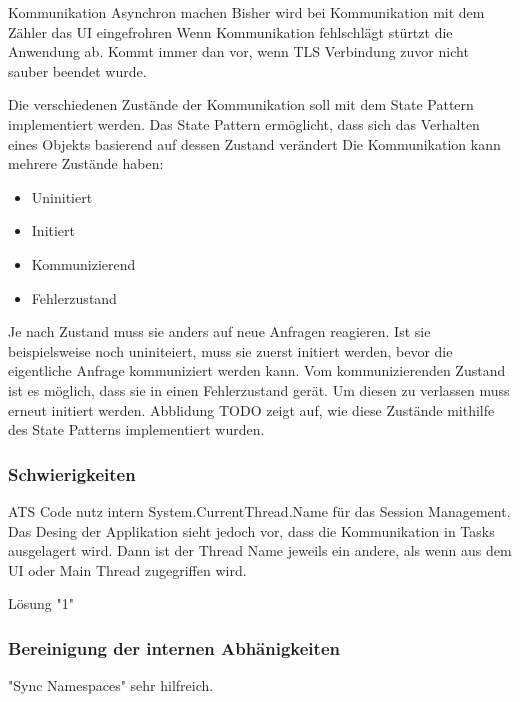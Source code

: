Kommunikation Asynchron machen
Bisher wird bei Kommunikation mit dem Zähler das UI eingefrohren
Wenn Kommunikation fehlschlägt stürtzt die Anwendung ab.
Kommt immer dan vor, wenn TLS Verbindung zuvor nicht sauber beendet wurde.

Die verschiedenen Zustände der Kommunikation soll mit dem State Pattern implementiert werden.
Das State Pattern ermöglicht, dass sich das Verhalten eines Objekts basierend auf dessen Zustand verändert \parencite{designPatterns}
Die Kommunikation kann mehrere Zustände haben:
\begin{itemize}
   \item Uninitiert
   \item Initiert
   \item Kommunizierend
   \item Fehlerzustand
\end{itemize}
Je nach Zustand muss sie anders auf neue Anfragen reagieren.
Ist sie beispielsweise noch uniniteiert, muss sie zuerst initiert werden, bevor die eigentliche Anfrage kommuniziert werden kann.
Vom kommunizierenden Zustand ist es möglich, dass sie in einen Fehlerzustand gerät.
Um diesen zu verlassen muss erneut initiert werden.
Abblidung TODO zeigt auf, wie diese Zustände mithilfe des State Patterns implementiert wurden.

\subsubsection{Schwierigkeiten}

ATS Code nutz intern System.CurrentThread.Name für das Session Management.
Das Desing der Applikation sieht jedoch vor, dass die Kommunikation in Tasks ausgelagert wird.
Dann ist der Thread Name jeweils ein andere, als wenn aus dem UI oder Main Thread zugegriffen wird.

Lösung "1"



\subsubsection{Bereinigung der internen Abhänigkeiten}
"Sync Namespaces" sehr hilfreich.

